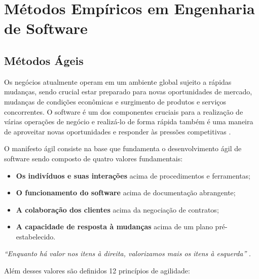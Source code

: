 \chapter{Métodos Empíricos em Engenharia de Software}

\section{Métodos Ágeis}
Os negócios atualmente operam em um ambiente global sujeito a rápidas mudanças, sendo crucial estar preparado para novas oportunidades de mercado, mudanças de condições econômicas e surgimento de produtos e serviços concorrentes. O software é um dos componentes cruciais para a realização de várias operações de negócio e realizá-lo de forma rápida também é uma maneira de aproveitar novas oportunidades e responder às pressões competitivas \cite{sommerville_2006}.

O manifesto ágil \cite{beck2001agile} consiste na base que fundamenta o desenvolvimento ágil de
software sendo composto de quatro valores fundamentais:

\begin{itemize}
    \item \textbf{Os indivíduos e suas interações} acima de procedimentos e ferramentas;
    \item \textbf{O funcionamento do software} acima de documentação abrangente;
    \item \textbf{A colaboração dos clientes} acima da negociação de contratos;
    \item \textbf{A capacidade de resposta à mudanças} acima de um plano pré-estabelecido.
\end{itemize}

\textit{``Enquanto há valor nos itens à direita, valorizamos mais os itens à esquerda''} \cite{beck2001agile}.

Além desses valores são definidos 12 princípios de agilidade:

